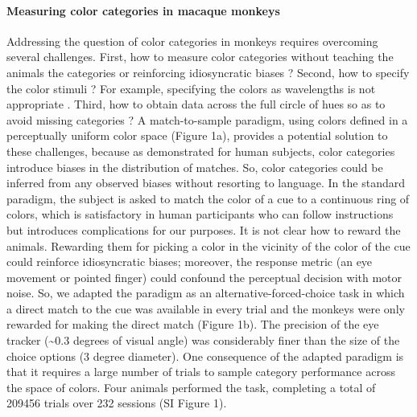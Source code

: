 \paragraph{Measuring color categories in macaque monkeys}

Addressing the question of color categories in monkeys requires overcoming several challenges. First, how to measure color categories without teaching the animals the categories or reinforcing idiosyncratic biases \citep{essock_color_1977,matsuno_color_2004}? Second, how to specify the color stimuli \citep{siuda-krzywicka_biological_2019}? For example, specifying the colors as wavelengths \citep{sandell_color_1979} is not appropriate \citep{davidoff_cross-species_2010}. 
Third, how to obtain data across the full circle of hues so as to avoid missing categories \citep{fagot_cross-species_2006}? A match-to-sample paradigm, using colors defined in a perceptually uniform color space \citep{stockman_colorimetry_2010} (Figure 1a), provides a potential solution to these challenges, because as demonstrated for human subjects\citep{bae_why_2015}, color categories introduce biases in the distribution of matches. So, color categories could be inferred from any observed biases without resorting to language. In the standard paradigm, the subject is asked to match the color of a cue to a continuous ring of colors, which is satisfactory in human participants who can follow instructions but introduces complications for our purposes. It is not clear how to reward the animals. Rewarding them for picking a color in the vicinity of the color of the cue could reinforce idiosyncratic biases\citep{panichello_error-correcting_2019}; moreover, the response metric (an eye movement or pointed finger) could confound the perceptual decision with motor noise. So, we adapted the paradigm as an alternative-forced-choice task in which a direct match to the cue was available in every trial and the monkeys were only rewarded for making the direct match (Figure 1b). The precision of the eye tracker (\textasciitilde0.3 degrees of visual angle) was considerably finer than the size of the choice options (3 degree diameter). One consequence of the adapted paradigm is that it requires a large number of trials to sample category performance across the space of colors. Four animals performed the task, completing a total of 209456 trials over 232 sessions (SI Figure 1).

